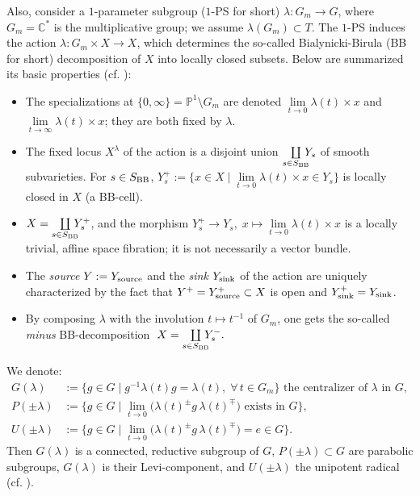 \documentclass[11pt,reqno]{amsart}
\let\mt\mapsto
\let\mbb\mathbb
\let\disp\displaystyle
\numberwithin{equation}{section}
\numberwithin{figure}{section}
\let\l\lambda
\let\sm\setminus
\begin{document}
Also, consider a $1$-parameter subgroup ($1$-PS for short) $\l:G_m\to G$, 
where $G_m={{\mbb C}}^*$ is the multiplicative group; we assume $\l(G_m)\subset T$. 
The $1$-PS induces the action $\l:G_m\times X\to X$, which determines the so-called 
Bialynicki-Birula (BB for short) decomposition of $X$ into locally closed subsets. 
Below are summarized its basic properties (cf. \cite{bb,kon}): 
\begin{itemize}
	\item 
		The specializations at $\{0,\infty\}=\mbb P^1\sm G_m$ are denoted 
		$\underset{t\to 0}{\lim}\l(t)\times x$ and $\underset{t\to\infty}{\lim}\l(t)\times x$; 
		they are both fixed by $\l$. 
	\item 
		The fixed locus $X^\l$ of the action is a disjoint union 
		$\underset{s\in S_{{\rm BB}}}{\coprod}\kern-1exY_s$ of smooth subvarieties. 
		For $s\in S_{{\rm BB}}$, 
		$Y_s^+:=\{x\in X\mid\underset{t\to 0}{\lim}\l(t)\times x\in Y_s\}$ 
		is locally closed in $X$ (a BB-cell).
	\item 
		$X=\underset{s\in S_{{\rm BB}}}{\coprod}\kern-1exY_s^+$, and the morphism 
		$Y_s^+\to Y_s,\; x\mt\underset{t\to0}{\lim}\l(t)\times x$ 
		is a locally trivial, affine space fibration; it is not necessarily a vector bundle. 
	\item 
		The \emph{source} $Y:=Y_{\rm source}$ and 
		the \emph{sink} $Y_{\text{\rm sink}}$ of the action are uniquely characterized 
		by the fact that $Y^+=Y_{\rm source}^+\subset X$ is open 
		and $Y_{\rm sink}^+=Y_{\rm sink}$. 
	\item 
		By composing $\l$ with the involution $t\mt t^{-1}$ of $G_m$, one gets 
		the so-called \emph{minus} BB-decomposition 
		$\; X=\underset{s\in S_{{\rm BB}}}{\coprod}\kern-1exY_s^-.$
\end{itemize}
We denote: 
\begin{equation}\label{eq:l}
\begin{array}{rl}
G(\l)&:=\big\{g\in G\mid g^{-1}\l(t)g=\l(t),\;\forall\,t\in G_m\big\}
\text{ the centralizer of $\l$ in $G$}, 
\\[1ex] \disp
P(\pm\l)&:=\big\{g\in G\mid\lim_{t\to 0}
\big(\l(t)^{\pm}g\,\l(t)^{\mp}\big)\text{ exists in }G\big\},
\\[1ex] \disp 
U(\pm\l)&:=\big\{g\in G\mid\lim_{t\to 0}
\big(\l(t)^{\pm}g\,\l(t)^{\mp}\big)=e\in G\big\}.
\end{array}
\end{equation}
Then $G(\l)$ is a connected, reductive subgroup of $G$, $P(\pm\l)\subset G$ are 
parabolic subgroups,  $G(\l)$ is their Levi-component, and $U(\pm\l)$ the unipotent 
radical (cf. \cite[\S 13.4]{sp}). 
\end{document}
